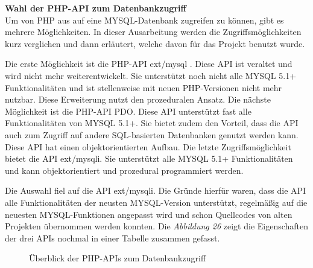 \textbf{Wahl der PHP-API zum Datenbankzugriff}\\
Um von PHP aus auf eine MYSQL-Datenbank zugreifen zu können, gibt es mehrere Möglichkeiten. In dieser Ausarbeitung werden die Zugriffsmöglichkeiten kurz verglichen und dann erläutert, welche davon für das Projekt benutzt wurde.

Die erste Möglichkeit ist die PHP-API \glqq ext/mysql \grqq{}. Diese API ist veraltet und wird nicht mehr weiterentwickelt. Sie unterstützt noch nicht alle MYSQL 5.1+ Funktionalitäten und ist stellenweise mit neuen PHP-Versionen nicht mehr nutzbar. Diese Erweiterung nutzt den prozeduralen Ansatz. Die nächste Möglichkeit ist die PHP-API \glqq PDO\grqq{}. Diese API unterstützt fast alle Funktionalitäten von MYSQL 5.1+. Sie bietet zudem den Vorteil, dass die API auch zum Zugriff auf andere SQL-basierten Datenbanken genutzt werden kann. Diese API hat einen objektorientierten Aufbau.  Die letzte Zugriffsmöglichkeit bietet die API \glqq ext/mysqli\grqq{}. Sie unterstützt alle MYSQL 5.1+ Funktionalitäten und kann objektorientiert und prozedural programmiert werden.

Die Auswahl fiel auf die API \glqq ext/mysqli\grqq{}. Die Gründe hierfür waren, dass die API alle Funktionalitäten der neusten MYSQL-Version unterstützt, regelmäßig auf die neuesten MYSQL-Funktionen angepasst wird und schon Quellcodes von alten Projekten übernommen werden konnten. Die \textit{Abbildung 26} zeigt die Eigenschaften der drei APIs nochmal in einer Tabelle zusammen gefasst.
\begin{figure}[H]
	\begin{center}
	\end{center}
	\caption{Überblick der PHP-APIs zum Datenbankzugriff}
\end{figure}

